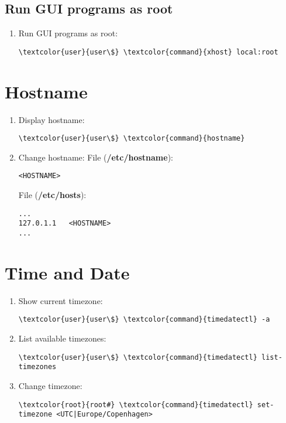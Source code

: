 \documentclass[10pt, a4paper, onecolumn, openany]{book} %
\begin{document}
\subsection{Run GUI programs as root}
\begin{enumerate}
    \item Run GUI programs as root:
\begin{Verbatim}[commandchars=\\\{\}]
\textcolor{user}{user\$} \textcolor{command}{xhost} local:root
\end{Verbatim}
\end{enumerate}
\section{Hostname}
\begin{enumerate}
    \item Display hostname:
\begin{Verbatim}[commandchars=\\\{\}]
\textcolor{user}{user\$} \textcolor{command}{hostname}
\end{Verbatim}
    \item Change hostname:
\newline File (\textbf{\textcolor{file}{/etc/hostname}}):
\begin{Verbatim}[commandchars=\\\{\}]
<HOSTNAME>
\end{Verbatim}
File (\textbf{\textcolor{file}{/etc/hosts}}):
\begin{Verbatim}[commandchars=\\\{\}]
...
127.0.1.1   <HOSTNAME>
...
\end{Verbatim}
\end{enumerate}
\section{Time and Date}
\begin{enumerate}
    \item Show current timezone:
\begin{Verbatim}[commandchars=\\\{\}]
\textcolor{user}{user\$} \textcolor{command}{timedatectl} -a
\end{Verbatim}
    \item List available timezones:
\begin{Verbatim}[commandchars=\\\{\}]
\textcolor{user}{user\$} \textcolor{command}{timedatectl} list-timezones
\end{Verbatim}
    \item Change timezone:
\begin{Verbatim}[commandchars=\\\{\}]
\textcolor{root}{root#} \textcolor{command}{timedatectl} set-timezone <UTC|Europe/Copenhagen>
\end{Verbatim}
\end{enumerate}
\end{document}
